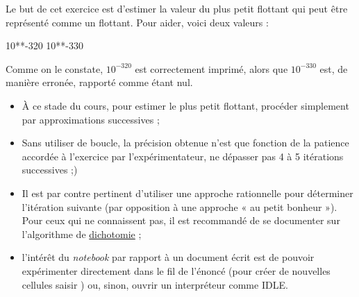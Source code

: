 \begin{exercise}[title=Plus petit flottant, level=basic]
Le but de cet exercice est d'estimer la valeur du plus petit flottant qui peut être représenté comme un flottant. Pour aider, voici deux valeurs :
\begin{idleconsole}
	\begin{pyconsole}
		10**-320
		10**-330
	\end{pyconsole}
\end{idleconsole}


Comme on le constate, $10^{−320}$ est correctement imprimé, alors que $10^{−330}$ est, de manière erronée, rapporté comme étant nul.

\noindent {}
\begin{itemize}\jazzitem
	\item À ce stade du cours, pour estimer le plus petit flottant, procéder simplement par approximations successives ;
	\item Sans utiliser de boucle, la précision obtenue n'est que fonction de la patience accordée à l'exercice par l'expérimentateur, ne dépasser pas 4 à 5 itérations successives ;)
	\item Il est par contre pertinent d'utiliser une approche rationnelle pour déterminer l'itération suivante (par opposition à une approche « au petit bonheur »). Pour ceux qui ne connaissent pas, il est recommandé de se documenter sur l'algorithme de \href{https://fr.wikipedia.org/wiki/Recherche\_dichotomique}{dichotomie} ;
	\item l'intérêt du \textit{notebook} par rapport à un document écrit est de pouvoir expérimenter directement dans le fil de l'énoncé (pour créer de nouvelles cellules saisir ) ou, sinon, ouvrir un interpréteur comme IDLE.
\end{itemize}
\end{exercise}

